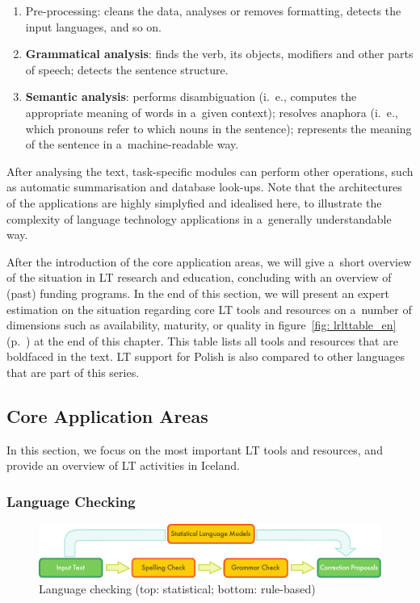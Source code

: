 \begin{multicols}{2}
\begin{enumerate} \item Pre-processing: cleans the data, analyses or
removes formatting, detects the input languages, and so on. \item
\textbf{Grammatical analysis}: finds the verb, its objects, modifiers
and other parts of speech; detects the sentence structure. \item
\textbf{Semantic analysis}: performs disambiguation (i.\, e., computes
the appropriate meaning of words in a~given context); resolves
anaphora (i.\, e., which pronouns refer to which nouns in the
sentence); represents the meaning of the sentence in
a~machine-readable way. \end{enumerate} 

After analysing the text, task-specific modules can perform other
operations, such as automatic summarisation and database look-ups.
Note that the architectures of the applications are highly simplyfied
and idealised here, to illustrate the complexity of language
technology applications in a~generally understandable way. 

After the introduction of the core application areas, we will give
a~short overview of the situation in LT research and education,
concluding with an overview of (past) funding programs. In the end of
this section, we will present an expert estimation on the situation
regarding core LT tools and resources on a~number of dimensions such
as availability, maturity, or quality in figure~\ref{fig:
lrlttable_en} (p.~\pageref{fig: lrlttable_en}) at the end of this
chapter. This table lists all tools and resources that are boldfaced
in the text. LT support for Polish is also compared to other languages
that are part of this series. 

\subsection{Core Application Areas} 

In this section, we focus on the most important LT tools and
resources, and provide an overview of LT activities in Iceland. 

\subsubsection{Language Checking} 

\begin{figure}[t]  \center
\includegraphics[width=\textwidth]{../_media/english/language_checking}
\caption{Language checking (top: statistical; bottom: rule-based)}
\label{fig: langcheckingaarch_en} 
\end{figure} 


\end{multicols}
